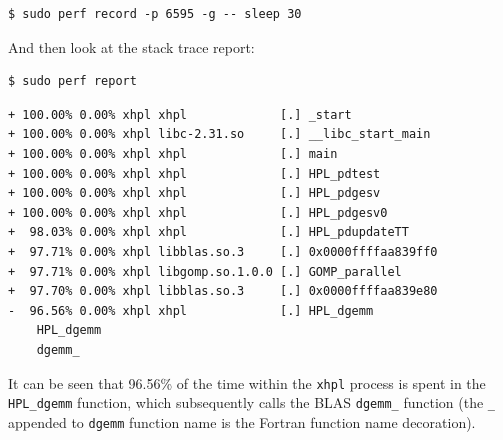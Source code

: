 \documentclass{report}
\begin{document}
\lstset{style=type}
\begin{lstlisting}
$ sudo perf record -p 6595 -g -- sleep 30
\end{lstlisting}

And then look at the stack trace report: 

\lstset{style=type}
\begin{lstlisting}
$ sudo perf report
\end{lstlisting}

\lstset{style=term}
\begin{lstlisting}
+ 100.00% 0.00% xhpl xhpl             [.] _start                                                                                        
+ 100.00% 0.00% xhpl libc-2.31.so     [.] __libc_start_main                                                                             
+ 100.00% 0.00% xhpl xhpl             [.] main                                                                                          
+ 100.00% 0.00% xhpl xhpl             [.] HPL_pdtest                                                                                    
+ 100.00% 0.00% xhpl xhpl             [.] HPL_pdgesv                                                                                    
+ 100.00% 0.00% xhpl xhpl             [.] HPL_pdgesv0                                                                                   
+  98.03% 0.00% xhpl xhpl             [.] HPL_pdupdateTT                                                                                
+  97.71% 0.00% xhpl libblas.so.3     [.] 0x0000ffffaa839ff0                                                                            
+  97.71% 0.00% xhpl libgomp.so.1.0.0 [.] GOMP_parallel                                                                                 
+  97.70% 0.00% xhpl libblas.so.3     [.] 0x0000ffffaa839e80                                                                            
-  96.56% 0.00% xhpl xhpl             [.] HPL_dgemm                                                                                     
    HPL_dgemm                                                                                                                                           
    dgemm_            
\end{lstlisting}

It can be seen that 96.56\% of the time within the \verb|xhpl| process is spent in the \verb|HPL_dgemm| function, which subsequently calls the BLAS \verb|dgemm_| function (the \verb|_| appended to \verb|dgemm| function name is the Fortran function name decoration).
 
\end{document}

